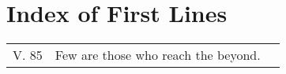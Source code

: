 
\chapter{Index of First Lines}

{\smaller
\setlength{\parskip}{0pt}
\setlength{\parindent}{0pt}

\begin{longtable}[c]{llr}
V. 85 & Few are those who reach the beyond. & \pageref{dhp-85}\\
\end{longtable}

}

